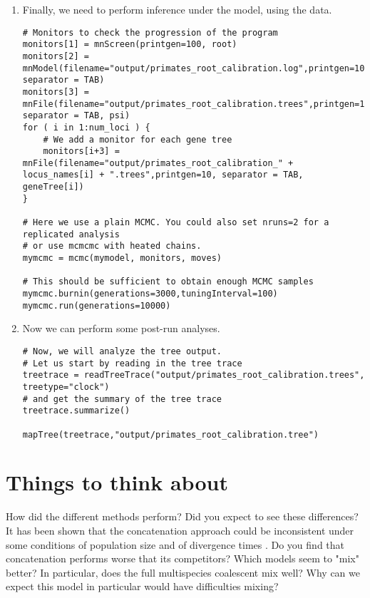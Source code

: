 \begin{enumerate}
\item Finally, we need to perform inference under the model, using the data.
{\tt \begin{snugshade*}
\begin{lstlisting}
# Monitors to check the progression of the program
monitors[1] = mnScreen(printgen=100, root)
monitors[2] = mnModel(filename="output/primates_root_calibration.log",printgen=10, separator = TAB)
monitors[3] = mnFile(filename="output/primates_root_calibration.trees",printgen=10, separator = TAB, psi)
for ( i in 1:num_loci ) { 
    # We add a monitor for each gene tree
    monitors[i+3] = mnFile(filename="output/primates_root_calibration_" + locus_names[i] + ".trees",printgen=10, separator = TAB, geneTree[i])
}

# Here we use a plain MCMC. You could also set nruns=2 for a replicated analysis
# or use mcmcmc with heated chains.
mymcmc = mcmc(mymodel, monitors, moves)

# This should be sufficient to obtain enough MCMC samples
mymcmc.burnin(generations=3000,tuningInterval=100)
mymcmc.run(generations=10000)
\end{lstlisting}
\end{snugshade*}}

\item Now we can perform some post-run analyses.
{\tt \begin{snugshade*}
\begin{lstlisting}
# Now, we will analyze the tree output.
# Let us start by reading in the tree trace
treetrace = readTreeTrace("output/primates_root_calibration.trees", treetype="clock")
# and get the summary of the tree trace
treetrace.summarize()

mapTree(treetrace,"output/primates_root_calibration.tree")
\end{lstlisting}
\end{snugshade*}}

\end{enumerate}



\section{Things to think about}
How did the different methods perform? 
Did you expect to see these differences?
It has been shown that the concatenation approach could be inconsistent under some conditions of population size and of divergence times \citep{Degnan2006}. 
Do you find that concatenation performs worse that its competitors?
Which models seem to "mix" better?
In particular, does the full multispecies coalescent mix well?
Why can we expect this model in particular would have difficulties mixing?


